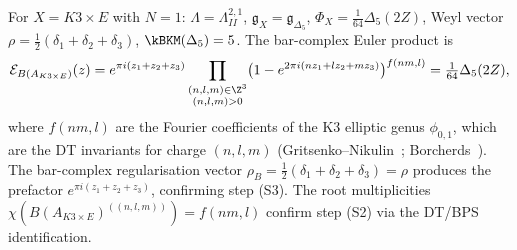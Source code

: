 \begin{example}
\label{ex:thy-k3e-denom-euler}
For $X = K3 \times E$ with $N=1$: $\Lambda = \Lambda^{2,1}_{II}$, $\mathfrak{g}_X = \mathfrak{g}_{\Delta_5}$, $\Phi_X = \tfrac{1}{64}\Delta_5(2Z)$, Weyl vector $\rho = \tfrac{1}{2}(\delta_1+\delta_2+\delta_3)$, $\kBKM(\Delta_5) = 5$. The bar-complex Euler product is
\[
 \mathcal{E}_{B(A_{K3\times E})}(z)
 = e^{\pi i(z_1+z_2+z_3)}
 \prod_{\substack{(n,l,m)\in\Z^3 \\ (n,l,m)>0}}
 \bigl(1 - e^{2\pi i(nz_1+lz_2+mz_3)}\bigr)^{f(nm,l)}
 = \tfrac{1}{64}\Delta_5(2Z),
\]
where $f(nm,l)$ are the Fourier coefficients of the K3 elliptic genus $\phi_{0,1}$, which are the DT invariants for charge $(n,l,m)$ \textup{(}Gritsenko--Nikulin~\cite{GritsenkoNikulin1998}; Borcherds~\cite{Borcherds1995}\textup{)}. The bar-complex regularisation vector $\rho_B = \tfrac{1}{2}(\delta_1+\delta_2+\delta_3) = \rho$ produces the prefactor $e^{\pi i(z_1+z_2+z_3)}$, confirming step (S3). The root multiplicities $\chi(B(A_{K3\times E})^{((n,l,m))}) = f(nm,l)$ confirm step (S2) via the DT/BPS identification.
\end{example}
